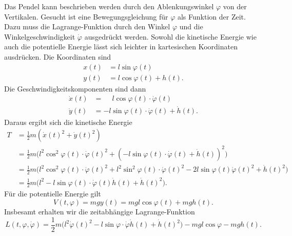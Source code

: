 Das Pendel kann beschrieben werden durch den Ablenkungswinkel $\varphi$
von der Vertikalen.
Gesucht ist eine Bewegungsgleichung für $\varphi$ als Funktion der Zeit.
Dazu muss die Lagrange-Funktion durch den Winkel $\varphi$ und die
Winkelgeschwindigkeit $\dot{\varphi}$ ausgedrückt werden.
Sowohl die kinetische Energie wie auch die potentielle Energie lässt
sich leichter in kartesischen Koordinaten ausdrücken.
Die Koordinaten sind
\begin{align*}
x(t)
&=
l \sin\varphi(t)
\\
y(t)
&=
l \cos\varphi(t) + h(t).
\end{align*}
Die Geschwindigkeitskomponenten sind dann
\begin{align*}
\dot{x}(t) &= \phantom{-}l \cos\varphi(t)\cdot \dot{\varphi}(t) \\
\dot{y}(t) &=          - l \sin\varphi(t)\cdot \dot{\varphi}(t) + \dot{h}(t).
\end{align*}
Daraus ergibt sich die kinetische Energie
\begin{align*}
T
&=
\frac12
m(\dot{x}(t)^2 + \dot{y}(t)^2)
\\
&=
\frac12m\bigl(
l^2 \cos^2 \varphi(t)\cdot\dot{\varphi}(t)^2
+
(-l\sin\varphi(t)\cdot\dot{\varphi}(t) + \dot{h}(t))^2
\bigr)
\\
&=
\frac12m\bigl(
l^2 \cos^2\varphi(t)\cdot\dot{\varphi}(t)^2
+
l^2 \sin^2\varphi(t)\cdot\dot{\varphi}(t)^2
-
2l\sin\varphi(t)\dot{\varphi}(t)^2
+
\dot{h}(t)^2
\bigr)
\\
&=
\frac12m\bigl(
l^2
-
l\sin \varphi(t)\cdot \dot{\varphi}(t)\dot{h}(t) + \dot{h}(t)^2
\bigr)
.
\end{align*}
Für die potentielle Energie gilt
\[
V(t,\varphi)
=
mgy(t)
=
mgl\cos\varphi(t) + mgh(t).
\]
Insbesamt erhalten wir die zeitabhängige Lagrange-Funktion
\[
L(t,\varphi,\dot{\varphi})
=
\frac12m\bigl(
l^2\dot{\varphi}(t)^2
-
l\sin \varphi\cdot \dot{\varphi}\dot{h}(t) + \dot{h}(t)^2
\bigr)
-
mgl\cos\varphi - mgh(t).
\]

%
%
